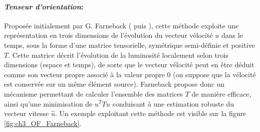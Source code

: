 \paragraph{\emph{Tenseur d'orientation}:\\}
Proposée initialement par G. Farneback (\cite{Farneback2000} puis \cite{Farneback}), cette méthode exploite une représentation en trois dimensions de l'évolution du vecteur vélocité $u$ dans le temps, sous la forme d'une matrice tensorielle, symétrique semi-définie et positive $T$. Cette matrice décrit l'évolution de la luminosité localement selon trois dimensions (espace et temps), de sorte que le vecteur vélocité peut en être déduit comme son vecteur propre associé à la valeur propre 0 (on suppose que la vélocité est conservée sur un même élément source). Farneback propose donc un mécanisme permettant de calculer l'ensemble des matrices $T$ de manière efficace, ainsi qu'une minimisation de ${u}^T T u$ conduisant à une estimation robuste du vecteur vitesse $\hat{u}$. Un exemple exploitant cette méthode est visible sur la figure \ref{fig:ch3_OF_Farneback}.\\

